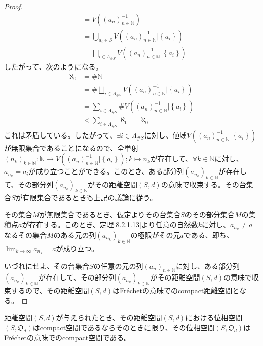\documentclass[dvipdfmx]{jsarticle}
\begin{document}
\begin{proof}
\begin{align*}
&= V\left( \left( a_{n} \right)_{n \in \mathbb{N}}^{- 1} \right)\\
&= \bigcup_{a_{i} \in S} {V\left( \left( a_{n} \right)_{n \in \mathbb{N}}^{- 1}|\left\{ a_{i} \right\} \right)}\\
&= \bigsqcup_{i \in \varLambda_{{\#}S}} {V\left( \left( a_{n} \right)_{n \in \mathbb{N}}^{- 1}|\left\{ a_{i} \right\} \right)}
\end{align*}
したがって、次のようになる。
\begin{align*}
\aleph_{0} &= {\#}\mathbb{N}\\
&= {\#}{\bigsqcup_{i \in \varLambda_{{\#}S}} {V\left( \left( a_{n} \right)_{n \in \mathbb{N}}^{- 1}|\left\{ a_{i} \right\} \right)}}\\
&= \sum_{i \in \varLambda_{{\#}S}} {{\#}{V\left( \left( a_{n} \right)_{n \in \mathbb{N}}^{- 1}|\left\{ a_{i} \right\} \right)}}\\
&< \sum_{i \in \varLambda_{{\#}S}} \aleph_{0} = \aleph_{0}
\end{align*}
これは矛盾している。したがって、$\exists i \in \varLambda_{{\#}S}$に対し、値域$V\left( \left( a_{n} \right)_{n \in \mathbb{N}}^{- 1}|\left\{ a_{i} \right\} \right)$が無限集合であることになるので、全単射$\left( n_{k} \right)_{k \in \mathbb{N}}:\mathbb{N} \rightarrow V\left( \left( a_{n} \right)_{n \in \mathbb{N}}^{- 1}|\left\{ a_{i} \right\} \right);k \mapsto n_{k}$が存在して、$\forall k \in \mathbb{N}$に対し、$a_{n_{k}} = a_{i}$が成り立つことができる。このとき、ある部分列$\left( a_{n_{k}} \right)_{k \in \mathbb{N}}$が存在して、その部分列$\left( a_{n_{k}} \right)_{k \in \mathbb{N}}$がその距離空間$(S,d)$の意味で収束する。その台集合$S$が有限集合であるときも上記の議論に従う。\par
その集合$M$が無限集合であるとき、仮定よりその台集合$S$のその部分集合$M$の集積点$a$が存在する。このとき、定理\ref{8.2.1.13}より任意の自然数$k$に対し、$a_{n_{k}} \neq a$なるその集合$M$のある元の列$\left( a_{n_{k}} \right)_{k \in \mathbb{N}}$の極限がその元$a$である、即ち、$\lim_{k \rightarrow \infty}a_{n_{k}} = a$が成り立つ。\par
いづれにせよ、その台集合$S$の任意の元の列$\left( a_{n} \right)_{n \in \mathbb{N}}$に対し、ある部分列$\left( a_{n_{k}} \right)_{k \in \mathbb{N}}$が存在して、その部分列$\left( a_{n_{k}} \right)_{k \in \mathbb{N}}$がその距離空間$(S,d)$の意味で収束するので、その距離空間$(S,d)$はFréchetの意味でのcompact距離空間となる。
\end{proof}
\begin{thm}\label{8.2.5.14}
距離空間$(S,d)$が与えられたとき、その距離空間$(S,d)$における位相空間$\left( S,\mathfrak{O}_{d} \right)$はcompact空間であるならそのときに限り、その位相空間$\left( S,\mathfrak{O}_{d} \right)$はFréchetの意味でのcompact空間である。
\end{thm}
\end{document}
